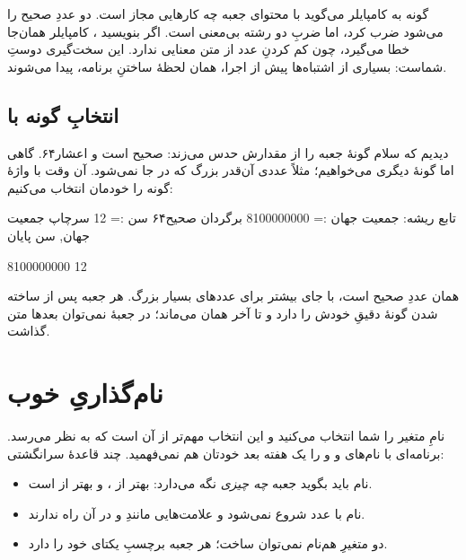 گونه به کامپایلر می‌گوید با محتوای جعبه چه کارهایی مجاز است. دو عددِ صحیح را
می‌شود ضرب کرد، اما ضربِ دو رشته بی‌معنی است. اگر بنویسید
، کامپایلر همان‌جا خطا می‌گیرد، چون کم کردنِ عدد از متن
معنایی ندارد. این سخت‌گیری دوستِ شماست:
بسیاری از اشتباه‌ها پیش از اجرا، همان لحظهٔ ساختنِ برنامه، پیدا می‌شوند.

\subsection{انتخابِ گونه با \texorpdfstring{}{برگردان}}

دیدیم که سلام گونهٔ جعبه را از مقدارش حدس می‌زند:  صحیح است و
 اعشار۶۴. گاهی اما گونهٔ دیگری می‌خواهیم؛ مثلاً عددی آن‌قدر بزرگ
که در  جا نمی‌شود. آن وقت با واژهٔ  گونه را خودمان
انتخاب می‌کنیم:

\begin{salamfa}
تابع ریشه:
    جمعیت جهان := 8100000000 برگردان صحیح۶۴
    سن := 12
    سرچاپ جمعیت جهان, سن
پایان
\end{salamfa}

\begin{progout}
8100000000 12
\end{progout}

 همان عددِ صحیح است، با جای بیشتر برای عددهای بسیار بزرگ.
هر جعبه پس از ساخته شدن گونهٔ دقیقِ خودش را دارد و تا آخر همان می‌ماند؛ در
جعبهٔ  نمی‌توان بعدها متن گذاشت.

\section{نام‌گذاریِ خوب}

نامِ متغیر را شما انتخاب می‌کنید و این انتخاب مهم‌تر از آن است که به نظر
می‌رسد. برنامه‌ای با نام‌های  و  و  را یک هفته
بعد خودتان هم نمی‌فهمید. چند قاعدهٔ سرانگشتی:

\begin{itemize}
  \item نام باید بگوید جعبه \emph{چه چیزی} نگه می‌دارد: 
        بهتر از ، و  بهتر از  است.
  \item نام با عدد شروع نمی‌شود و علامت‌هایی مانندِ \code{+} و \code{-} در
        آن راه ندارند.
  \item دو متغیرِ هم‌نام نمی‌توان ساخت؛ هر جعبه برچسبِ یکتای خود را دارد.
\end{itemize}

